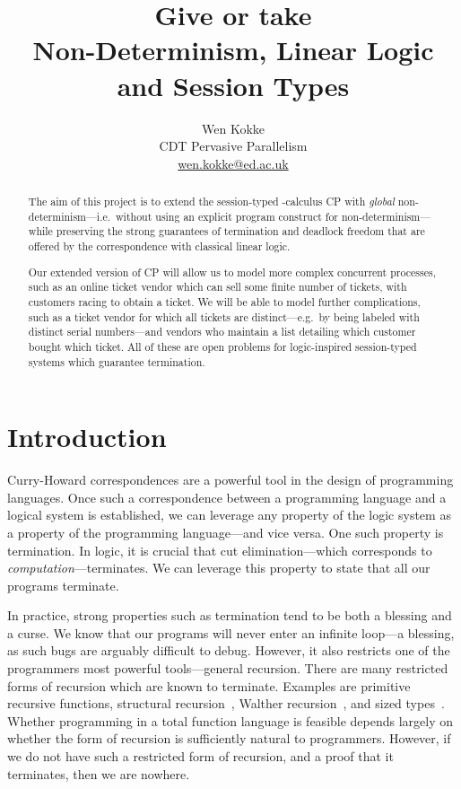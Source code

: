 \documentclass[10pt,a4paper,twocolumn,notitlepage]{article}
\title{Give or take \\
  {\large Non-Determinism, Linear Logic and Session Types}}
\author{Wen Kokke \\
  CDT Pervasive Parallelism \\
  \url{wen.kokke@ed.ac.uk}}
\begin{document}
\maketitle

\begin{abstract}
  The aim of this project is to extend the session-typed \textpi-calculus CP
  \citep{wadler2012} with \emph{global} non-determinism---i.e.\ without using an
  explicit program construct for non-determinism---while preserving the strong
  guarantees of termination and deadlock freedom that are offered by the
  correspondence with classical linear logic. 
  
  Our extended version of CP will allow us to model more complex concurrent
  processes, such as an online ticket vendor which can sell some finite number
  of tickets, with customers racing to obtain a ticket.
  We will be able to model further complications, such as a ticket vendor for
  which all tickets are distinct---e.g.\ by being labeled with distinct serial
  numbers---and vendors who maintain a list detailing which customer bought
  which ticket.
  All of these are open problems for logic-inspired session-typed systems which
  guarantee termination.
\end{abstract}

\section{Introduction}
Curry-Howard correspondences are a powerful tool in the design of programming
languages. Once such a correspondence between a programming language and a
logical system is established, we can leverage any property of the logic system
as a property of the programming language---and vice versa. One such property is
termination. In logic, it is crucial that cut elimination---which corresponds to
\emph{computation}---terminates. We can leverage this property to state that all
our programs terminate.

In practice, strong properties such as termination tend to be both a blessing
and a curse. We know that our programs will never enter an infinite loop---a
blessing, as such bugs are arguably difficult to debug. However, it also
restricts one of the programmers most powerful tools---general recursion.
There are many restricted forms of recursion which are known to
terminate. Examples are primitive recursive functions, structural
recursion~\citep{burstall1969}, Walther recursion~\citep{walther1994}, and sized
types~\citep{lee2001}. Whether programming in a total function language is
feasible depends largely on whether the form of recursion is sufficiently
natural to programmers.
However, if we do not have such a restricted form of recursion, and a proof that
it terminates, then we are nowhere.
\end{document}
